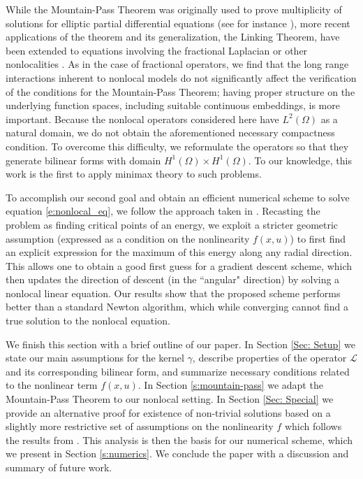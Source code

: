 \documentclass[11pt]{amsart}   	%
\theoremstyle{plain}
\numberwithin{equation}{section}
\begin{document}
While the Mountain-Pass Theorem was originally used to prove multiplicity of solutions for elliptic partial differential equations (see for instance \cite{choi1993semiwave, choi1993mountain, clark1972variant, de2009multiple, degiovanni2022variational,  kajikiya2005critical, rabinowitz1986minimax, struwe2000variational}), more recent applications of the theorem and its generalization, the Linking Theorem, have been extended to equations involving the fractional Laplacian or other nonlocalities \cite{bisci2014mountain, bisci2014three, bisci2016variational, bors2014application, chammem2023combined, dipierro2017fractional, gu2018infinitely, maione2023variational, servadei2012mountain, servadei2013variational}. As in the case of fractional operators, we find that the long range interactions inherent to nonlocal models do not significantly affect the verification of the conditions for the Mountain-Pass Theorem; having proper structure on the underlying function spaces, including suitable continuous embeddings, is more important. 
Because the nonlocal operators considered here have $L^2(\Omega)$ as a natural domain, we do not obtain the aforementioned necessary compactness condition. To overcome this difficulty, we reformulate the operators so that they generate bilinear forms with domain $H^1(\Omega)\times H^1(\Omega)$. To our knowledge, this work is the first to apply minimax theory to such problems. 



To accomplish our second goal and obtain an efficient numerical scheme to solve equation \eqref{e:nonlocal_eq}, we follow the approach taken in \cite{bailova2021mountain, bailova2023new,  choi1993semiwave, choi1993mountain}. 
Recasting the problem as finding critical points of an energy, we exploit a stricter geometric assumption (expressed as a condition on the nonlinearity $f(x,u)$) to first find an explicit expression for the maximum of this energy along any radial direction. This allows one to obtain a good first guess for a gradient descent scheme, which then updates the direction of descent (in the ``angular" direction) by solving a nonlocal linear equation. Our results show that the proposed scheme performs better than a standard Newton algorithm, which while converging cannot find a true solution to the nonlocal equation.
 

We finish this section with a brief outline of our paper. In Section \ref{Sec: Setup} we state our main assumptions for the kernel $\gamma$, describe properties of the operator $\mathcal{L}$ and its corresponding bilinear form, and summarize necessary conditions related to the nonlinear term $f(x,u)$. In Section \ref{s:mountain-pass} we adapt the Mountain-Pass Theorem to our nonlocal setting. In Section \ref{Sec: Special} we provide an alternative proof for existence of non-trivial solutions based on a slightly more restrictive set of assumptions on the nonlinearity $f$ which follows the results from \cite{bailova2021mountain}. This analysis is then the basis for our numerical scheme, which we present in Section \ref{s:numerics}. We conclude the paper with a discussion and summary of future work.
\end{document}
